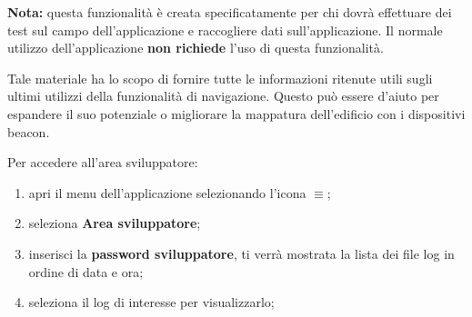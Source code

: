 \documentclass[../ClipsManualeUtente.tex]{subfiles}
\begin{document}
		\begin{framed}
			\textbf{Nota:} questa funzionalità è creata specificatamente per chi dovrà effettuare dei test sul campo dell'applicazione e raccogliere dati sull'applicazione. Il normale utilizzo dell'applicazione \textbf{non richiede} l'uso di questa funzionalità.
		\end{framed}
		
		Tale materiale ha lo scopo di fornire tutte le informazioni ritenute utili sugli ultimi utilizzi della  funzionalità di navigazione. Questo può essere d'aiuto per espandere il suo potenziale o migliorare la mappatura dell'edificio con i dispositivi beacon.
		
		Per accedere all'area sviluppatore:
		\begin{enumerate}
			\item apri il menu dell'applicazione selezionando l'icona $\equiv$;
			\item seleziona \textbf{Area sviluppatore}; %
			\item inserisci la \textbf{password sviluppatore}, ti verrà mostrata la lista dei file log in ordine di data e ora;
			\item seleziona il log di interesse per visualizzarlo; 
		\end{enumerate}
\end{document}
